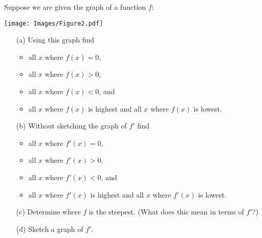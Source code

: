 \documentclass[handout,nooutcomes]{ximera}
\begin{document}
\begin{problem}
  Suppose we are given the graph of a function $f$:
  \begin{image}
    \texttt{[image: Images/Figure2.pdf]}
  \end{image}
  \begin{itemize}
    \item[(a)]
      Using this graph find
      \begin{itemize}
        \item 
          all $x$ where $f(x) = 0$,
        \item 
          all $x$ where $f(x) > 0$, 
        \item
          all $x$ where $f(x) < 0$, and
        \item
          all $x$ where $f(x)$ is highest and all $x$ where $f(x)$ is lowest.
      \end{itemize}

    \item[(b)]
      Without sketching the graph of $f'$ find
      \begin{itemize}
        \item 
          all $x$ where $f'(x) = 0$,

        \item
          all $x$ where $f'(x) > 0$,
        
        \item
          all $x$ where $f'(x) < 0$, and

        \item
          all $x$ where $f'(x)$ is highest and all $x$ where $f'(x)$ is lowest.
      \end{itemize}

    \item[(c)]
      Determine where $f$ is the steepest.
      (What does this mean in terms of $f'$?)

    \item[(d)]
      Sketch a graph of $f'$.
  \end{itemize}
\end{problem}
\end{document}
